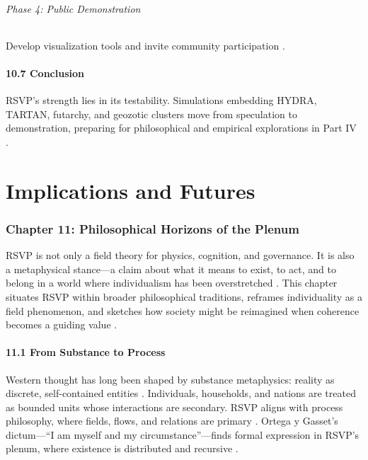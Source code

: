 \documentclass[12pt]{article}
\begin{document}
{{\paragraph{Phase 4: Public Demonstration}
Develop visualization tools and invite community participation \citep{hanson2003}.

\subsection*{10.7 Conclusion}

RSVP’s strength lies in its testability. Simulations embedding HYDRA, TARTAN, futarchy, and geozotic clusters move from speculation to demonstration, preparing for philosophical and empirical explorations in Part IV \citep{whitehead1978}.

\part{Implications and Futures}

\section*{Chapter 11: Philosophical Horizons of the Plenum}

RSVP is not only a field theory for physics, cognition, and governance. It is also a metaphysical stance—a claim about what it means to exist, to act, and to belong in a world where individualism has been overstretched \citep{ortega1957}. This chapter situates RSVP within broader philosophical traditions, reframes individuality as a field phenomenon, and sketches how society might be reimagined when coherence becomes a guiding value \citep{whitehead1978}.

\subsection*{11.1 From Substance to Process}

Western thought has long been shaped by substance metaphysics: reality as discrete, self-contained entities \citep{whitehead1978}. Individuals, households, and nations are treated as bounded units whose interactions are secondary. RSVP aligns with process philosophy, where fields, flows, and relations are primary \citep{deleuze1987}. Ortega y Gasset’s dictum—“I am myself and my circumstance”—finds formal expression in RSVP’s plenum, where existence is distributed and recursive \citep{ortega1957}.

}}
\end{document}
